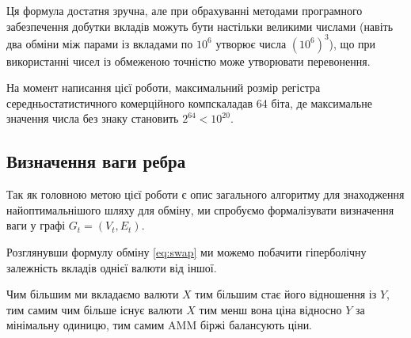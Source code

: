 \documentclass[a4paper, 11pt]{article}
\newcommand{\tqs}{\textquotesingle}
\begin{document}
%
%
%

Ця формула достатня зручна, але при обрахуванні методами програмного
забезпечення добутки вкладів можуть бути настільки великими числами
(навіть два
обміни між парами із вкладами по \(10^6\) утворює числа \((10^6)^3\)), що при
використанні чисел із обмеженою точністю може утворювати перевонення.

На момент написання цієї роботи, максимальний розмір регістра
середньостатистичного комерційного комп скаладав 64 біта, де
максимальне значення числа без знаку становить \(2^{64} < 10^{20}\).

\subsection{Визначення ваги ребра}

Так як головною метою цієї роботи є опис загального алгоритму для знаходження
найоптимальнішого шляху для обміну, ми спробуємо формалізувати визначення ваги у
графі \(G_{t} = (V_{t}, E_{t})\).

Розглянувши формулу обміну \eqref{eq:swap} ми можемо побачити гіперболічну
залежність вкладів однієї валюти від іншої.

Чим більшим ми вкладаємо валюти \(X\) тим більшим стає його відношення із \(Y\),
тим самим чим більше існує валюти \(X\) тим менш вона ціна відносно \(Y\) за
мінімальну одиницю, тим самим AMM біржі балансують ціни.

\printbibliography
\end{document}

